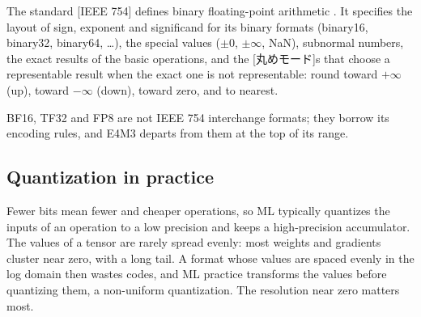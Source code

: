 \documentclass[../main.tex]{subfiles}
\begin{document}
\begin{definition}
  The standard [IEEE 754] defines binary floating-point
  arithmetic \cite{ieee754-2019}.  It specifies the layout of sign,
  exponent and significand for its binary formats (binary16, binary32,
  binary64, \ldots), the special values ($\pm 0$, $\pm\infty$, NaN),
  subnormal numbers, the exact results of the basic operations, and the
  [丸めモード]s that choose a representable result
  when the exact one is not representable: round toward $+\infty$
  (up), toward $-\infty$ (down), toward zero, and to nearest.
\end{definition}

%
BF16, TF32 and FP8 are not IEEE 754 interchange formats; they borrow its
encoding rules, and E4M3 departs from them at the top of its
range.

\subsection{Quantization in practice}

Fewer bits mean fewer and cheaper operations, so ML typically
quantizes the inputs of an operation to a low precision and keeps a
high-precision accumulator.  The values of a tensor are rarely spread
evenly: most weights and gradients cluster near zero, with a long tail.
A format whose values are spaced evenly in the log domain then wastes
codes, and ML practice transforms the values before quantizing them, a
non-uniform quantization.  The resolution near zero matters most.
\end{document}
